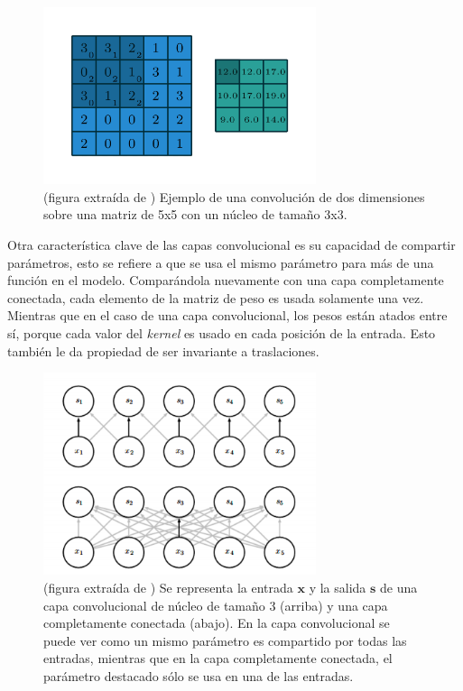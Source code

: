 \documentclass[spanish]{article}
\theoremstyle{definition}
\theoremstyle{remark}
\numberwithin{equation}{section}
\numberwithin{equation}{section} %
\begin{document}
\begin{figure}[H]
 \centering
 \includegraphics[width=8cm]{img/convolution_example_1.PNG}
\caption[CNN interacciones dispersas]{\footnotesize{ (figura extraída de  \cite{dumoulin2016guide}) Ejemplo de una convolución de dos dimensiones sobre una matriz de 5x5 con un núcleo de tamaño 3x3.    }}
\label{fig:sparseCNN}
\end{figure}
Otra característica clave de las capas convolucional es su capacidad de compartir parámetros, esto se refiere a que se usa el mismo parámetro para más de una función en el modelo. Comparándola nuevamente con una capa completamente conectada, cada elemento de la matriz de peso es usada solamente una vez. Mientras que en el caso de una capa convolucional, los pesos están atados entre sí, porque cada valor del \textit{kernel} es usado en cada posición de la entrada. Esto también le da propiedad de ser invariante a traslaciones. 
\par
\begin{figure}[H]
 \centering
 \includegraphics[width=8cm]{img/CNN_Parameter_Sharing.png}
\caption[CNN compartir parámetros]{\footnotesize{ (figura extraída de \cite{goodfellow2016deep}) Se representa la entrada $\boldsymbol{x}$ y la salida $\boldsymbol{s}$ de una capa convolucional de núcleo de tamaño 3 (arriba) y una capa completamente conectada (abajo). En la capa convolucional se puede ver como un mismo parámetro es compartido por todas las entradas, mientras que en la capa completamente conectada, el parámetro destacado sólo se usa en una de las entradas.  }}
\label{fig:sharingCNN}
\end{figure}
\end{document}
